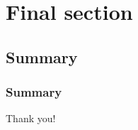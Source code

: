 \documentclass{beamer}
\begin{document}
\section{Final section}

\subsection{Summary}
\begin{frame}
\frametitle{Summary}
\centerline{Thank you!}
\end{frame}

\end{document}
